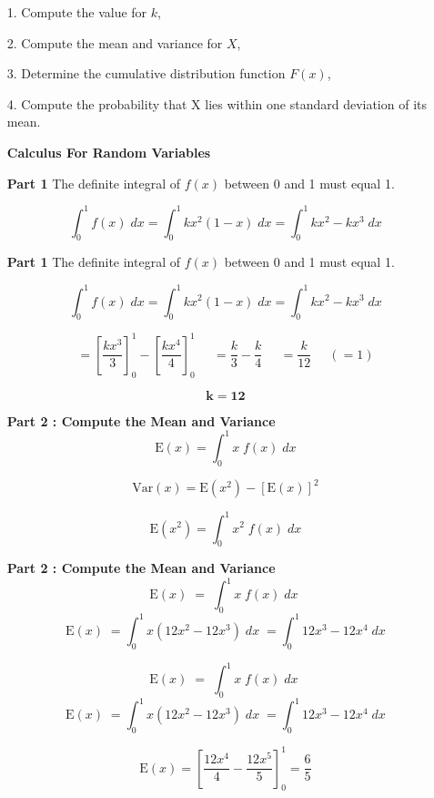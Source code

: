 			\begin{itemize}
				\item[1.] Compute the value for $k$,
				\item[2.] Compute the mean and variance for $X$,
				\item[3.] Determine the cumulative distribution function $F(x)$,
				\item[4.] Compute the probability that X lies within one standard deviation of its mean.
			
			
			
			\noindent \textbf{Calculus For Random Variables}
			
			\textbf{Part 1}
			The definite integral of $f(x)$ between 0 and 1 must equal 1.
			
			\[ \int^1_0 f(x)\;dx = \int^1_0 kx^2(1-x)\;dx = \int^1_0 kx^2-kx^3\;dx  \]
			
			
			
			\textbf{Part 1}
			The definite integral of $f(x)$ between 0 and 1 must equal 1.
			
			\[ \int^1_0 f(x)\;dx = \int^1_0 kx^2(1-x)\;dx = \int^1_0 kx^2-kx^3\;dx  \]
			
			\[ = \left[\frac{kx^3}{3} \right]^1_0  - \left[\frac{kx^4}{4} \right]^1_0
			\phantom{sce} = \frac{k}{3} - \frac{k}{4} \phantom{sce} = \frac{k}{12} \phantom{sce}(= 1)
			\]
			
			\[ \boldsymbol{k = 12}\]
			
			\textbf{Part 2 :  Compute the Mean and Variance}
			\[ \mathrm{E}(x) = \int^1_0 x\; f(x)\;dx  \]
			
			\[ \mathrm{Var}(x) = \mathrm{E}(x^2)  - [\mathrm{E}(x)]^2   \]
			
			\[ \mathrm{E}(x^2) = \int^1_0 x^2\; f(x)\;dx \]
			
			\textbf{Part 2 :  Compute the Mean and Variance}
			\[ \mathrm{E}(x) \; = \; \int^1_0 x\; f(x)\;dx \;   \]
			\[ \mathrm{E}(x) \; = \int^1_0 x(12x^2-12x^3)\;dx  \; = \int^1_0 12x^3-12x^4\;dx  \]
			
			
			
			\[ \mathrm{E}(x) \; = \; \int^1_0 x\; f(x)\;dx \;   \]
			\[ \mathrm{E}(x) \; = \int^1_0 x(12x^2-12x^3)\;dx  \; = \int^1_0 12x^3-12x^4\;dx  \]
			
			\[ \mathrm{E}(x)  = \left[\frac{12x^4}{4}-\frac{12x^5}{5} \right]^1_0 = \frac{6}{5} \]
			

\end{itemize}
